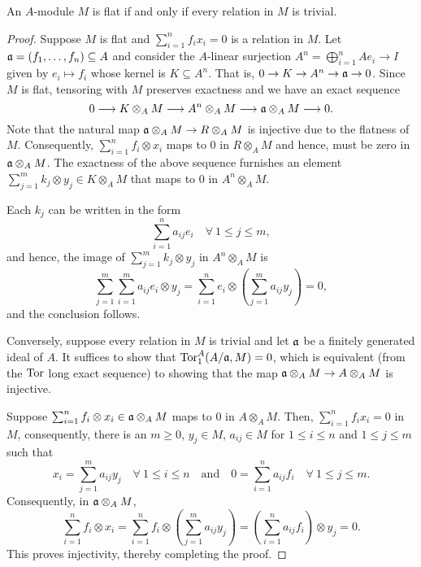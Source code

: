 \begin{lemma}
    An $A$-module $M$ is flat if and only if every relation in $M$ is trivial.
\end{lemma}
\begin{proof}
    Suppose $M$ is flat and $\sum_{i = 1}^n f_ix_i = 0$ is a relation in $M$. Let $\mathfrak{a} = (f_1,\dots,f_n)\subseteq A$ and consider the $A$-linear surjection $A^n = \bigoplus_{i = 1}^n Ae_i\to I$ given by $e_i\mapsto f_i$ whose kernel is $K\subseteq A^n$. That is, $0\to K\to A^n\to \mathfrak{a}\to 0$. Since $M$ is flat, tensoring with $M$ preserves exactness and we have an exact sequence 
    \begin{equation*}
        0\longrightarrow K\otimes_A M\longrightarrow A^n\otimes_A M\longrightarrow \mathfrak{a}\otimes_A M\longrightarrow 0.
    \end{equation*}
    Note that the natural map $\mathfrak{a}\otimes_A M\to R\otimes_A M$ is injective due to the flatness of $M$. Consequently, $\sum_{i = 1}^n f_i\otimes x_i$ maps to $0$ in $R\otimes_A M$ and hence, must be zero in $\mathfrak{a}\otimes_A M$. The exactness of the above sequence furnishes an element $\sum_{j = 1}^m k_j\otimes y_j\in K\otimes_A M$ that maps to $0$ in $A^n\otimes_A M$.

    Each $k_j$ can be written in the form 
    \begin{equation*}
        \sum_{i = 1}^n a_{ij}e_i\quad\forall~1\le j\le m,
    \end{equation*}
    and hence, the image of $\sum_{j = 1}^m k_j\otimes y_j$ in $A^n\otimes_A M$ is 
    \begin{equation*}
        \sum_{j = 1}^m\sum_{i = 1}^m a_{ij}e_i\otimes y_j = \sum_{i = 1}^n e_i\otimes\left(\sum_{j = 1}^m a_{ij}y_j\right) = 0,
    \end{equation*}
    and the conclusion follows.

    Conversely, suppose every relation in $M$ is trivial and let $\mathfrak{a}$ be a finitely generated ideal of $A$. It suffices to show that $\operatorname{Tor}_1^A(A/\mathfrak{a}, M) = 0$, which is equivalent (from the $\operatorname{Tor}$ long exact sequence) to showing that the map $\mathfrak{a}\otimes_A M\to A\otimes_A M$ is injective.

    Suppose $\sum_{i = 1}^n f_i\otimes x_i\in\mathfrak{a}\otimes_A M$ maps to $0$ in $A\otimes_A M$. Then, $\sum_{i = 1}^n f_ix_i = 0$ in $M$, consequently, there is an $m\ge 0$, $y_j\in M$, $a_{ij}\in M$ for $1\le i\le n$ and $1\le j\le m$ such that 
    \begin{equation*}
        x_i = \sum_{j = 1}^m a_{ij}y_j\quad\forall~1\le i\le n\quad\text{and}\quad 0 = \sum_{i = 1}^n a_{ij}f_i\quad\forall~1\le j\le m.
    \end{equation*}
    Consequently, in $\mathfrak{a}\otimes_A M$,
    \begin{equation*}
        \sum_{i = 1}^n f_i\otimes x_i = \sum_{i = 1}^n f_i\otimes\left(\sum_{j = 1}^m a_{ij}y_j\right) = \left(\sum_{i = 1}^n a_{ij}f_i\right)\otimes y_j = 0.
    \end{equation*}
    This proves injectivity, thereby completing the proof.
\end{proof}

